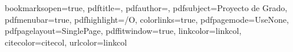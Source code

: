 \usepackage{amsmath,amssymb}             %
\usepackage[left=1.0in,right=1.0in,top=1.0in,bottom=1.0in,includefoot,includehead,headheight=13.6pt]{geometry}
\renewcommand{\baselinestretch}{1.05}


\usepackage[nottoc, notlof, notlot]{tocbibind}
\usepackage{minitoc}
\setcounter{minitocdepth}{2}
\mtcindent=15pt

\usepackage{aecompl}


\usepackage{ifpdf}


\usepackage{color}



\hypersetup
{
bookmarksopen=true,
pdftitle={\titulovar},
pdfauthor={\authorA},
pdfsubject={Proyecto de Grado},
pdfmenubar=true, %
pdfhighlight=/O, %
colorlinks=true, %
pdfpagemode=UseNone,
pdfpagelayout=SinglePage, %
pdffitwindow=true, %
linkcolor=linkcol, %
citecolor=citecol, %
urlcolor=linkcol %
}


\setcounter{secnumdepth}{3}
\setcounter{tocdepth}{2}


\newcommand{\pd}[2]{\frac{\partial #1}{\partial #2}}
\def\abs{\operatorname{abs}}
\def\argmax{\operatornamewithlimits{arg\,max}}
\def\argmin{\operatornamewithlimits{arg\,min}}
\def\diag{\operatorname{Diag}}
\newcommand{\eqRef}[1]{(\ref{#1})}

\usepackage{rotating}                    %
\usepackage{fancyhdr}                    %

